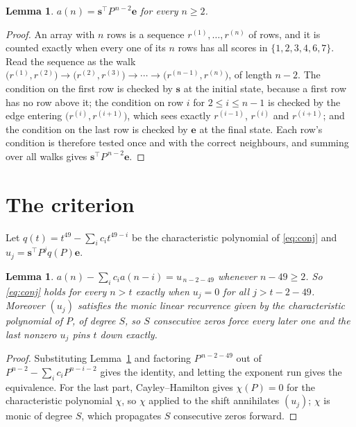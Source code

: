 \documentclass[11pt,a4paper]{article}
\theoremstyle{plain}
\newtheorem{lemma}[theorem]{Lemma}
\theoremstyle{definition}
\begin{document}
\begin{lemma}\label{lem:walk}
$a(n)=\mathbf{s}^{\!\top}P^{\,n-2}\mathbf{e}$ for every $n\ge2$.
\end{lemma}

\begin{proof}
An array with $n$ rows is a sequence $r^{(1)},\dots,r^{(n)}$ of rows, and it is counted
exactly when every one of its $n$ rows has all scores in $\{1,2,3,4,6,7\}$. Read the sequence as the
walk $\bigl(r^{(1)},r^{(2)}\bigr)\to\bigl(r^{(2)},r^{(3)}\bigr)\to\cdots\to
\bigl(r^{(n-1)},r^{(n)}\bigr)$, of length $n-2$. The condition on the first row is
checked by $\mathbf{s}$ at the initial state, because a first row has no row above it; the
condition on row $i$ for $2\le i\le n-1$ is checked by the edge entering
$\bigl(r^{(i)},r^{(i+1)}\bigr)$, which sees exactly $r^{(i-1)}$, $r^{(i)}$ and
$r^{(i+1)}$; and the condition on the last row is checked by $\mathbf{e}$ at the final
state. Each row's condition is therefore tested once and with the correct neighbours, and
summing over all walks gives $\mathbf{s}^{\!\top}P^{\,n-2}\mathbf{e}$.
\end{proof}

\section{The criterion}

Let $q(t)=t^{49}-\sum_i c_i t^{49-i}$ be the characteristic polynomial of
\eqref{eq:conj} and $u_j=\mathbf{s}^{\!\top}P^{j}q(P)\mathbf{e}$.

\begin{lemma}\label{lem:crit}
$a(n)-\sum_i c_i a(n-i)=u_{\,n-2-49}$ whenever $n-49\ge2$. So \eqref{eq:conj}
holds for every $n>t$ exactly when $u_j=0$ for all $j>t-2-49$. Moreover $(u_j)$
satisfies the monic linear recurrence given by the characteristic polynomial of $P$, of
degree $S$, so $S$ consecutive zeros force every later one and the last nonzero $u_j$ pins
$t$ down exactly.
\end{lemma}

\begin{proof}
Substituting Lemma~\ref{lem:walk} and factoring $P^{\,n-2-49}$ out of
$P^{n-2}-\sum_i c_i P^{n-i-2}$ gives the identity, and letting the exponent run gives the
equivalence. For the last part, Cayley--Hamilton gives $\chi(P)=0$ for the characteristic
polynomial $\chi$, so $\chi$ applied to the shift annihilates $(u_j)$; $\chi$ is monic of
degree $S$, which propagates $S$ consecutive zeros forward.
\end{proof}
\end{document}
